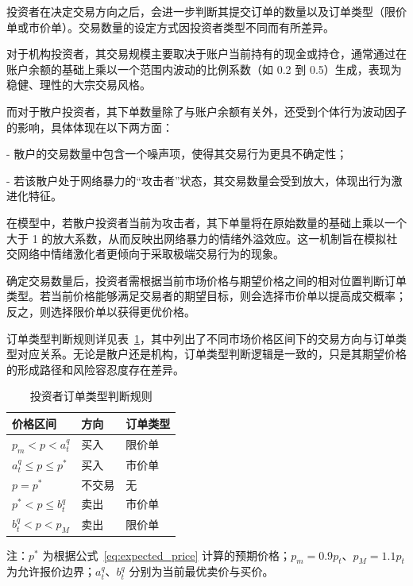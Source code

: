 投资者在决定交易方向之后，会进一步判断其提交订单的数量以及订单类型（限价单或市价单）。交易数量的设定方式因投资者类型不同而有所差异。

对于机构投资者，其交易规模主要取决于账户当前持有的现金或持仓，通常通过在账户余额的基础上乘以一个范围内波动的比例系数（如 0.2 到 0.5）生成，表现为稳健、理性的大宗交易风格。

而对于散户投资者，其下单数量除了与账户余额有关外，还受到个体行为波动因子的影响，具体体现在以下两方面：

- 散户的交易数量中包含一个噪声项，使得其交易行为更具不确定性；

- 若该散户处于网络暴力的“攻击者”状态，其交易数量会受到放大，体现出行为激进化特征。

在模型中，若散户投资者当前为攻击者，其下单量将在原始数量的基础上乘以一个大于 1 的放大系数，从而反映出网络暴力的情绪外溢效应。这一机制旨在模拟社交网络中情绪激化者更倾向于采取极端交易行为的现象。

确定交易数量后，投资者需根据当前市场价格与期望价格之间的相对位置判断订单类型。若当前价格能够满足交易者的期望目标，则会选择市价单以提高成交概率；反之，则选择限价单以获得更优价格。

订单类型判断规则详见表~\ref{tab:order_decision}，其中列出了不同市场价格区间下的交易方向与订单类型对应关系。无论是散户还是机构，订单类型判断逻辑是一致的，只是其期望价格的形成路径和风险容忍度存在差异。

\begin{table}[htbp]
    \renewcommand{\arraystretch}{1.5}
    \centering
    \large
    \begin{threeparttable}
    \begin{tabular}{@{} >{\centering\arraybackslash}p{5.5cm} 
                    >{\centering\arraybackslash}p{3.5cm} 
                    >{\centering\arraybackslash}p{5.5cm} @{}}
    \toprule\toprule
    \textbf{价格区间} & \textbf{方向} & \textbf{订单类型} \\
    \midrule
    \( p_m < p < a_t^q \) & 买入 & 限价单 \\
    \( a_t^q \leq p \leq p^* \) & 买入 & 市价单 \\
    \( p = p^* \) & 不交易 & 无 \\
    \( p^* < p \leq b_t^q \) & 卖出 & 市价单 \\
    \( b_t^q < p < p_M \) & 卖出 & 限价单 \\
    \bottomrule\bottomrule
    \end{tabular}
    
    \vspace{1em}
    
    \begin{tablenotes}
    \item[] 注：\( p^* \) 为根据公式~\ref{eq:expected_price} 计算的预期价格；\( p_m = 0.9p_t \)、\( p_M = 1.1p_t \) 为允许报价边界；\( a_t^q \)、\( b_t^q \) 分别为当前最优卖价与买价。
    \end{tablenotes}
    
    \caption{投资者订单类型判断规则}
    \label{tab:order_decision}
    \end{threeparttable}
    \end{table}
    
